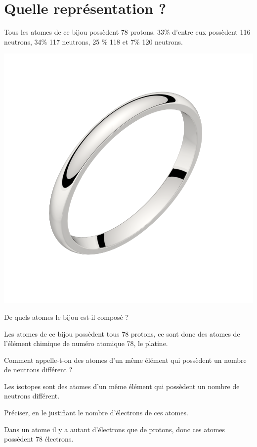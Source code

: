 \section{Quelle représentation ?}

\begin{multicols}{2}
	Tous les atomes de ce bijou possèdent 78 protons. 33\% d'entre eux possèdent 116 neutrons, 34\% 117 neutrons, 25 \% 118 et 7\% 120 neutrons.

	
	\begin{center}
		\includegraphics[scale=0.12]{img/ring2}
	\end{center}
\end{multicols}


\begin{questions}
	\question[1] De quels atomes le bijou est-il composé ?
	\begin{solution}
		Les atomes de ce bijou possèdent tous 78 protons, ce sont donc des atomes de l'élément chimique de numéro atomique 78, le platine.
	\end{solution}
	
	\question[1] Comment appelle-t-on des atomes d'un même élément qui possèdent un nombre de neutrons différent ?
	\begin{solution}
		Les isotopes sont des atomes d'un même élément qui possèdent un nombre de neutrons différent.
	\end{solution}
	
	\question[1] Préciser, en le justifiant le nombre d'électrons de ces atomes.
	\begin{solution}
		Dans un atome il y a autant d'électrons que de protons, donc ces atomes possèdent 78 électrons. 
	\end{solution}
\end{questions}
